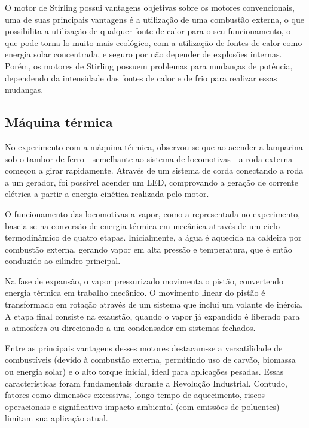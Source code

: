 O motor de Stirling possui vantagens objetivas sobre os motores convencionais, uma de suas principais vantagens é a utilização de uma combustão externa, o que possibilita a utilização de qualquer fonte de calor para o seu funcionamento, o que pode torna-lo muito mais ecológico, com a utilização de fontes de calor como energia solar concentrada, e seguro por não depender de explosões internas. Porém, os motores de Stirling possuem problemas para mudanças de potência, dependendo da intensidade das fontes de calor e de frio para realizar essas mudanças. 

\subsection{Máquina térmica} %
No experimento com a máquina térmica, observou-se que ao acender a lamparina sob o tambor de ferro - semelhante ao sistema de locomotivas - a roda externa começou a girar rapidamente. Através de um sistema de corda conectando a roda a um gerador, foi possível acender um LED, comprovando a geração de corrente elétrica a partir a energia cinética realizada pelo motor.

O funcionamento das locomotivas a vapor, como a representada no experimento, baseia-se na conversão de energia térmica em mecânica através de um ciclo termodinâmico de quatro etapas. Inicialmente, a água é aquecida na caldeira por combustão externa, gerando vapor em alta pressão e temperatura, que é então conduzido ao cilindro principal.

Na fase de expansão, o vapor pressurizado movimenta o pistão, convertendo energia térmica em trabalho mecânico. O movimento linear do pistão é transformado em rotação através de um sistema que inclui um volante de inércia. A etapa final consiste na exaustão, quando o vapor já expandido é liberado para a atmosfera ou direcionado a um condensador em sistemas fechados.

Entre as principais vantagens desses motores destacam-se a versatilidade de combustíveis (devido à combustão externa, permitindo uso de carvão, biomassa ou energia solar) e o alto torque inicial, ideal para aplicações pesadas. Essas características foram fundamentais durante a Revolução Industrial. Contudo, fatores como dimensões excessivas, longo tempo de aquecimento, riscos operacionais e significativo impacto ambiental (com emissões de poluentes) limitam sua aplicação atual.